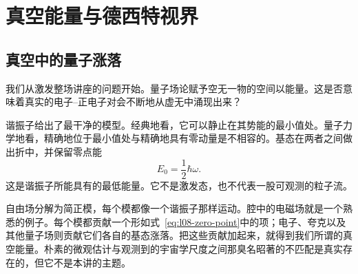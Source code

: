 \chapter{真空能量与德西特视界}


\section{真空中的量子涨落}

我们从激发整场讲座的问题开始。量子场论赋予空无一物的空间以能量。这是否意味着真实的电子--正电子对会不断地从虚无中涌现出来？

\begin{classroomqa}
\end{classroomqa}

谐振子给出了最干净的模型。经典地看，它可以静止在其势能的最小值处。量子力学地看，精确地位于最小值处与精确地具有零动量是不相容的。基态在两者之间做出折中，并保留零点能
\begin{equation}
E_0=\frac{1}{2}\hbar\omega.
\label{eq:l08-zero-point}
\end{equation}
这是谐振子所能具有的最低能量。它不是激发态，也不代表一股可观测的粒子流。

自由场分解为简正模，每个模都像一个谐振子那样运动。腔中的电磁场就是一个熟悉的例子。每个模都贡献一个形如式~\eqref{eq:l08-zero-point}中的项；电子、夸克以及其他量子场则贡献它们各自的基态涨落。把这些贡献加起来，就得到我们所谓的真空能量。朴素的微观估计与观测到的宇宙学尺度之间那臭名昭著的不匹配是真实存在的，但它不是本讲的主题。

\begin{classroomqa}
\end{classroomqa}


